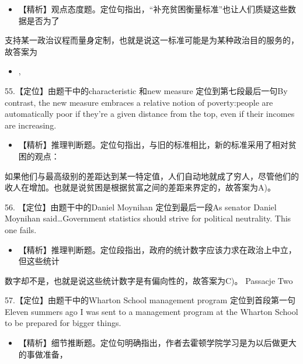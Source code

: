 \documentclass[UTF8,11pt]{ctexart}
\begin{document}
\begin{itemize}[leftmargin=2em,itemsep=.2em,topsep=.4em]\item[B.] 【精析】观点态度题。定位句指出，“补充贫困衡量标准”也让人们质疑这些数据是否为了
\end{itemize}

支持某一政治议程而量身定制，也就是说这一标准可能是为某种政治目的服务的，故答案为


\begin{itemize}[leftmargin=2em,itemsep=.2em,topsep=.4em]\item[B.] ,
\end{itemize}

55.【定位】由题干中的characteristic 和new measure 定位到第七段最后一句By contrast, the new measure embraces a relative notion of poverty:people are automatically poor if they're a given distance from the top, even if their incomes are increasing.


\begin{itemize}[leftmargin=2em,itemsep=.2em,topsep=.4em]\item[A.] 【精析】推理判断题。定位句指出，与旧的标准相比，新的标准采用了相对贫困的观点：
\end{itemize}

如果他们与最高级别的差距达到某一特定值，人们自动地就成了穷人，尽管他们的收人在增加。也就是说贫困是根据贫富之间的差距来界定的，故答案为A)。


56. 【定位】由题干中的Daniel Moynihan 定位到最后一段As senator Daniel Moynihan said…Government statistics should strive for political neutrality. This one fails.


\begin{itemize}[leftmargin=2em,itemsep=.2em,topsep=.4em]\item[C.] 【精析】推理判断题。定位段指出，政府的统计数字应该力求在政治上中立，但这些统计
\end{itemize}

数字却不是，也就是说这些统计数字是有偏向性的，故答案为C)。 Passacje Two


57.【定位】由题干中的Wharton School management program 定位到首段第一句Eleven summers ago I was sent to a management program at the Wharton School to be prepared for bigger things.


\begin{itemize}[leftmargin=2em,itemsep=.2em,topsep=.4em]\item[B.] 【精析】细节推断题。定位句明确指出，作者去霍顿学院学习是为以后做更大的事做准备，
\end{itemize}
\end{document}
